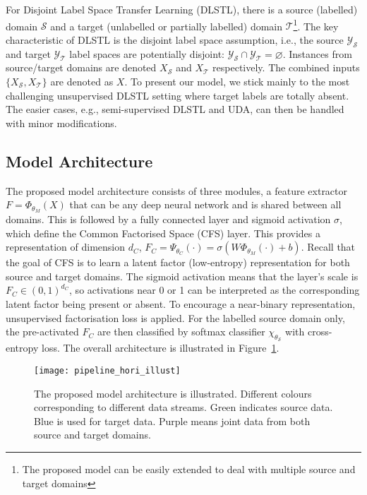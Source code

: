 \documentclass[letterpaper]{article} \usepackage{aaai19}  \usepackage{times}  \usepackage{helvet}  \usepackage{courier}  \usepackage{url}  \usepackage{graphicx}
\begin{document}
For Disjoint Label Space Transfer Learning (DLSTL), there is a source (labelled) domain $\mathcal{S}$ and a target (unlabelled or partially labelled) domain $\mathcal{T}$\footnote{The proposed model can be easily extended to deal with multiple source and target domains}. The key characteristic of DLSTL is the disjoint label space assumption, i.e., the source $\mathcal{Y}_\mathcal{S}$ and target $\mathcal{Y}_\mathcal{T}$ label spaces are potentially disjoint: $\mathcal{Y}_\mathcal{S} \cap \mathcal{Y}_\mathcal{T} = \varnothing$. Instances from source/target domains are denoted  $X_\mathcal{S}$ and $X_\mathcal{T}$ respectively. The combined inputs $\{X_\mathcal{S}, X_\mathcal{T}\}$ are denoted as $X$. To present our model, we stick mainly to the most challenging unsupervised DLSTL setting where target labels are totally absent. The easier cases, e.g., semi-supervised DLSTL and UDA, can then be handled with minor modifications.

\subsection{Model Architecture}
The proposed model architecture consists of three modules, a feature extractor $F=\Phi_{\theta_M}(X)$ that can be any deep neural network and is shared between all domains. This is followed by a fully connected layer and sigmoid activation $\sigma$, which define the Common Factorised Space (CFS) layer. This provides a representation of dimension $d_C$, $F_C=\Psi_{\theta_C}(\cdot)={\sigma}(W\Phi_{\theta_M}(\cdot)+b)$. Recall that the goal of CFS is to learn a latent factor (low-entropy) representation for both source and target domains. The sigmoid activation means that the layer's scale is $F_C\in(0,1)^{d_C}$, so activations near 0 or 1 can be interpreted as the corresponding latent factor being present or absent. To encourage a near-binary representation, unsupervised factorisation loss is applied.
For the labelled source domain only, the pre-activated $F_C$ are then classified by softmax classifier $\chi_{\theta_\mathcal{S}}$ with cross-entropy loss. 
The overall architecture is illustrated in Figure~\ref{fig:model_arch_illus}.

\begin{figure}[t]
\centering    
\texttt{[image: pipeline\_hori\_illust]}
\caption{The proposed model architecture is illustrated. Different colours corresponding to different data streams. Green indicates source data. Blue is used for target data. Purple means joint data from both source and target domains.}
\label{fig:model_arch_illus}
\end{figure}
\end{document}
